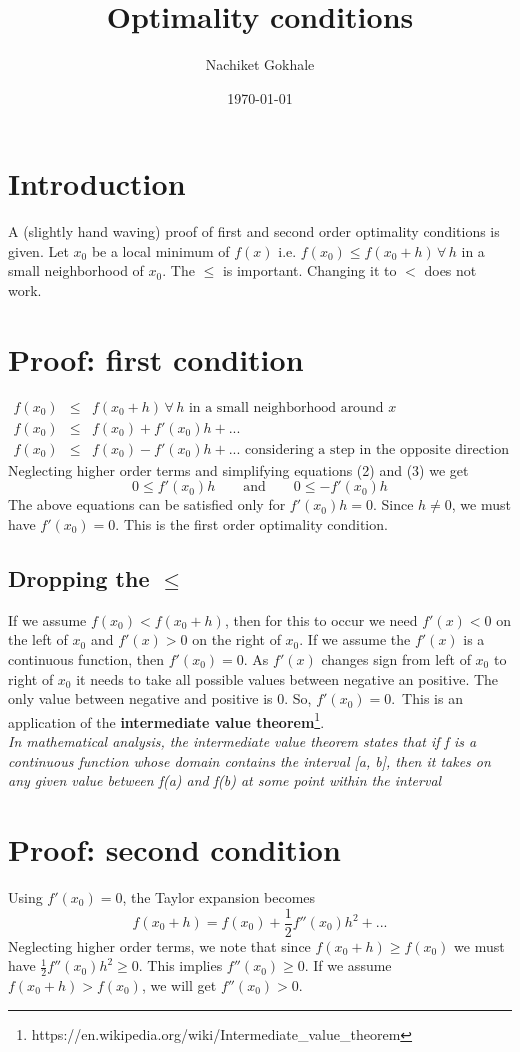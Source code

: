 \documentclass{article}
\newcommand{\beq}{\begin{equation}}
\newcommand{\eeq}{\end{equation}}
\newcommand{\ber}{\begin{eqnarray}}
\newcommand{\eer}{\end{eqnarray}}
\begin{document}
\title{Optimality conditions}
\author{Nachiket Gokhale}
\date{\today}
\maketitle
\section{Introduction}
A (slightly hand waving) proof of first and second order optimality conditions is given. Let $x_0$ be a local minimum of $f(x)$ i.e. $f(x_0) \leq f(x_0+h) \,\forall\, h $ in a small neighborhood of $x_0$. The $\leq$ is important. Changing it to $<$ does not work.
\section{Proof: first condition}
\ber
f(x_0) &\leq& f(x_0+h)  \,\forall\, h \text{ in a small neighborhood around } x \\
f(x_0) &\leq& f(x_0) + f'(x_0)h + ...\\ 
f(x_0) &\leq& f(x_0) - f'(x_0)h + ... \text{ considering a step in the opposite direction }
\eer
Neglecting higher order terms and simplifying equations (2) and (3) we get
\beq
0 \leq f'(x_0)h \qquad \text{and} \qquad 0 \leq -f'(x_0)h
\eeq
The above equations can be satisfied only for $f'(x_0)h=0$. Since $h\neq{0}$, we must have $f'(x_0)=0$. This is the first order optimality condition.
\subsection{Dropping the $\leq$}
If we assume $f(x_0)<f(x_0+h)$, then for this to occur we need $f'(x)<0$ on the left of $x_0$ and $f'(x)>0$ on the right of $x_0$. If we assume the $f'(x)$ is a continuous function, then $f'(x_0)=0$. As $f'(x)$ changes sign from left of $x_0$ to right of $x_0$ it needs to take all possible values between negative an positive. The only value between negative and positive is $0$. So, $f'(x_0)=0$.\
This is an application of the \textbf{intermediate value theorem}\footnote{https://en.wikipedia.org/wiki/Intermediate\_value\_theorem}. \\
\textit{In mathematical analysis, the intermediate value theorem states that if f is a continuous function whose domain contains the interval [a, b], then it takes on any given value between f(a) and f(b) at some point within the interval}

\section{Proof: second condition}
Using $f'(x_0)=0$, the Taylor expansion becomes
\beq
f(x_0+h) = f(x_0) + \frac{1}{2}f''(x_0)h^2 + ...
\eeq
Neglecting higher order terms, we note that since $f(x_0+h) \geq f(x_0)$ we must have $\frac{1}{2}f''(x_0)h^2 \geq 0$. This implies $f''(x_0) \geq 0$. If we assume $f(x_0+h) > f(x_0)$, we will get $f''(x_0) > 0$.
\end{document}
